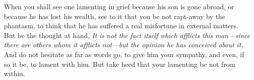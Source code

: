 When you shall  see one lamenting in  grief because his son is  gone abroad, or
because he  has lost his  wealth, see to  it that you  be not rapt-away  by the
phantasm, to think that he has  suffered a real misfortune in external matters.
But be the thought at hand, \emph{It is not the fact itself which afflicts this
man---since there  are others  whom it  afflicts not---but  the opinion  he has
conceived about it.} And  do not hesitate as far as words go,  to give him your
sympathy, and even,  if so it be, to  lament with him. But take  heed that your
lamenting be not from within.
